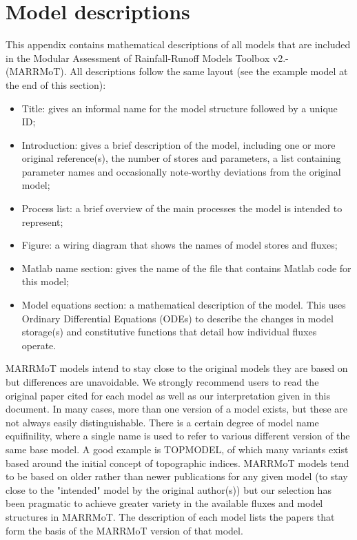 \chapter{Model descriptions}
This appendix contains mathematical descriptions of all models that are included in the Modular Assessment of Rainfall-Runoff Models Toolbox v2.- (MARRMoT). All descriptions follow the same layout (see the example model at the end of this section):

\begin{itemize}
	\item Title: gives an informal name for the model structure followed by a unique ID;
	\item Introduction: gives a brief description of the model, including one or more original reference(s), the number of stores and parameters, a list containing parameter names and occasionally note-worthy deviations from the original model;
	\item Process list: a brief overview of the main processes the model is intended to represent;
	\item Figure: a wiring diagram that shows the names of model stores and fluxes;
	\item Matlab name section: gives the name of the file that contains Matlab code for this model;
	\item Model equations section: a mathematical description of the model. This uses Ordinary Differential Equations (ODEs) to describe the changes in model storage(s) and constitutive functions that detail how individual fluxes operate.
\end{itemize}

MARRMoT models intend to stay close to the original models they are based on but differences are unavoidable. We strongly recommend users to read the original paper cited for each model as well as our interpretation given in this document. In many cases, more than one version of a model exists, but these are not always easily distinguishable. There is a certain degree of model name equifinility, where a single name is used to refer to various different version of the same base model. A good example is TOPMODEL, of which many variants exist based around the initial concept of topographic indices. MARRMoT models tend to be based on older rather than newer publications for any given model (to stay close to the "intended" model by the original author(s)) but our selection has been pragmatic to achieve greater variety in the available fluxes and model structures in MARRMoT. The description of each model lists the papers that form the basis of the MARRMoT version of that model.

